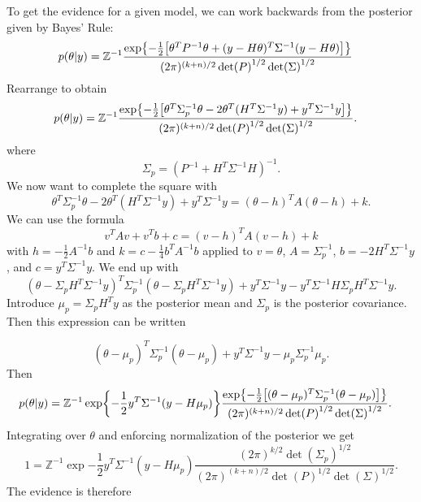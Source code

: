 \documentclass[11pt]{article}
\begin{document}
	To get the evidence for a given model, we can work backwards from the posterior given by Bayes' Rule:
	\begin{align}
		p(\theta | y)
		&= \mathbb{Z}^{-1} \frac{\exp{-\frac{1}{2}\qty[\theta^T P^{-1} \theta + (y - H\theta)^T \Sigma^{-1}(y - H\theta)]} }{(2 \pi)^{(k+n)/2} \det(P)^{1/2} \det(\Sigma)^{1/2} } 
	\end{align}
	Rearrange to obtain
	\begin{align}
		p(\theta | y)
		&= \mathbb{Z}^{-1} \frac{\exp{-\frac{1}{2}\qty[\theta^T \Sigma_p^{-1}\theta - 2 \theta^T(H^{T} \Sigma^{-1} y) + y^T\Sigma^{-1} y]} }{(2 \pi)^{(k+n)/2} \det(P)^{1/2} \det(\Sigma)^{1/2} } .
	\end{align}
	where \begin{equation}
		\Sigma_p = (P^{-1} + H^T \Sigma^{-1} H)^{-1} .
	\end{equation}
	We now want to complete the square with
	\begin{equation}
		\theta^T \Sigma_p^{-1}\theta - 2 \theta^T(H^{T} \Sigma^{-1} y) + y^T\Sigma^{-1} y = (\theta - h)^T A (\theta -h) + k .
	\end{equation}
	We can use the formula
	\begin{equation}
		v^T A v + v^T b + c = (v-h)^T A (v-h) + k 
	\end{equation}
	with $ h = -\frac{1}{2} A^{-1} b $ and $k = c - \frac{1}{4}b^T A^{-1}b $
	applied to $ v= \theta$, $A = \Sigma_p^{-1}$, $b= -2 H^T \Sigma^{-1} y$, and $c = y^T \Sigma^{-1} y$.
	We end up with
	\begin{equation}
		(\theta -  \Sigma_p H^T \Sigma^{-1}y)^T \Sigma_p^{-1} (\theta- \Sigma_p H^T \Sigma^{-1} y) + y^{T} \Sigma^{-1} y - y^T \Sigma^{-1} H \Sigma_p H^T \Sigma^{-1} y . 
	\end{equation}
	Introduce $\mu_p = \Sigma_p H^T y $ as the posterior mean and $\Sigma_p$ is the posterior covariance. 
	Then this expression can be written
	
	\begin{equation}
		(\theta -  \mu_p)^T \Sigma_p^{-1} (\theta- \mu_p) + y^{T} \Sigma^{-1} y -  \mu_p \Sigma_p^{-1}  \mu_p. 
	\end{equation}
	Then 
	\begin{align}
		p(\theta | y)
		&= \mathbb{Z}^{-1} \exp{-\frac{1}{2} y^{T} \Sigma^{-1} (y -  H \mu_p) }\frac{\exp{-\frac{1}{2}\qty[	(\theta -  \mu_p)^T \Sigma_p^{-1} (\theta- \mu_p)]} }{(2 \pi)^{(k+n)/2} \det(P)^{1/2} \det(\Sigma)^{1/2} } .
	\end{align}
	Integrating over $\theta$ and enforcing normalization of the posterior we get
	\begin{equation}
		1 = \mathbb{Z}^{-1} \exp{-\frac{1}{2} y^{T} \Sigma^{-1} (y -  H \mu_p) }\frac{(2 \pi)^{k/2} \det(\Sigma_p)^{1/2}}{(2 \pi)^{(k+n)/2} \det(P)^{1/2} \det(\Sigma)^{1/2} } .
	\end{equation}
	The evidence is therefore 
	
\end{document}
